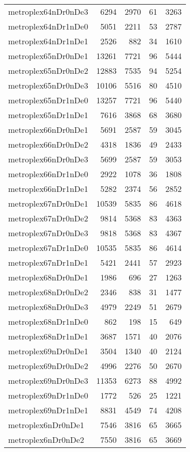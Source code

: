\documentclass[../../../thesis.tex]{subfiles}
\begin{document}
\begin{longtable}{lrrrr}
metroplex64nDr0nDe3 & 6294 & 2970 & 61 & 3263 \\
metroplex64nDr1nDe0 & 5051 & 2211 & 53 & 2787 \\
metroplex64nDr1nDe1 & 2526 & 882 & 34 & 1610 \\
metroplex65nDr0nDe1 & 13261 & 7721 & 96 & 5444 \\
metroplex65nDr0nDe2 & 12883 & 7535 & 94 & 5254 \\
metroplex65nDr0nDe3 & 10106 & 5516 & 80 & 4510 \\
metroplex65nDr1nDe0 & 13257 & 7721 & 96 & 5440 \\
metroplex65nDr1nDe1 & 7616 & 3868 & 68 & 3680 \\
metroplex66nDr0nDe1 & 5691 & 2587 & 59 & 3045 \\
metroplex66nDr0nDe2 & 4318 & 1836 & 49 & 2433 \\
metroplex66nDr0nDe3 & 5699 & 2587 & 59 & 3053 \\
metroplex66nDr1nDe0 & 2922 & 1078 & 36 & 1808 \\
metroplex66nDr1nDe1 & 5282 & 2374 & 56 & 2852 \\
metroplex67nDr0nDe1 & 10539 & 5835 & 86 & 4618 \\
metroplex67nDr0nDe2 & 9814 & 5368 & 83 & 4363 \\
metroplex67nDr0nDe3 & 9818 & 5368 & 83 & 4367 \\
metroplex67nDr1nDe0 & 10535 & 5835 & 86 & 4614 \\
metroplex67nDr1nDe1 & 5421 & 2441 & 57 & 2923 \\
metroplex68nDr0nDe1 & 1986 & 696 & 27 & 1263 \\
metroplex68nDr0nDe2 & 2346 & 838 & 31 & 1477 \\
metroplex68nDr0nDe3 & 4979 & 2249 & 51 & 2679 \\
metroplex68nDr1nDe0 & 862 & 198 & 15 & 649 \\
metroplex68nDr1nDe1 & 3687 & 1571 & 40 & 2076 \\
metroplex69nDr0nDe1 & 3504 & 1340 & 40 & 2124 \\
metroplex69nDr0nDe2 & 4996 & 2276 & 50 & 2670 \\
metroplex69nDr0nDe3 & 11353 & 6273 & 88 & 4992 \\
metroplex69nDr1nDe0 & 1772 & 526 & 25 & 1221 \\
metroplex69nDr1nDe1 & 8831 & 4549 & 74 & 4208 \\
metroplex6nDr0nDe1 & 7546 & 3816 & 65 & 3665 \\
metroplex6nDr0nDe2 & 7550 & 3816 & 65 & 3669 \\

\end{longtable}
\end{document}
